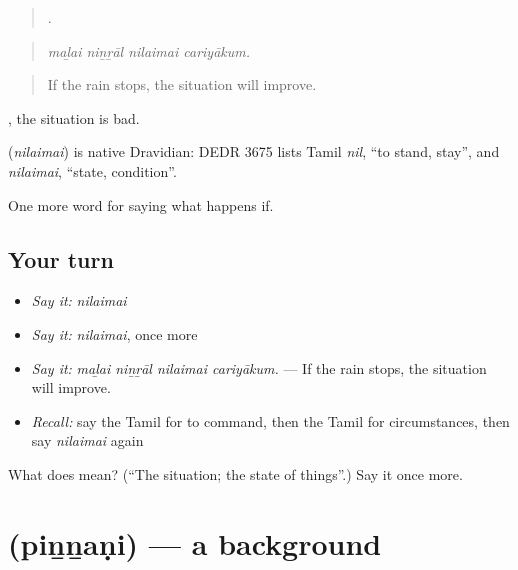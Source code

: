 \begin{quote}
   .
\end{quote}

\begin{quote}
\emph{maḻai niṉṟāl nilaimai cariyākum.}
\end{quote}

\begin{quote}
If the rain stops, the situation will improve.
\end{quote}

  , the situation is bad.

\begin{cousinweb}
\textbf{} (\emph{nilaimai}) is native Dravidian: DEDR 3675 lists Tamil \emph{nil}, \textquotedblleft{}to stand, stay\textquotedblright{}, and \emph{nilaimai}, \textquotedblleft{}state, condition\textquotedblright{}.
\end{cousinweb}

\begin{grammarlens}[title={What you've built}]
One more word for saying what happens if.
\end{grammarlens}

\subsection*{Your turn}
\begin{itemize}
\raggedright
  \item \emph{Say it:} \emph{nilaimai}
  \item \emph{Say it:} \emph{nilaimai}, once more
  \item \emph{Say it:} \emph{maḻai niṉṟāl nilaimai cariyākum.} — If the rain stops, the situation will improve.
  \item \emph{Recall:} say the Tamil for to command, then the Tamil for circumstances, then say \emph{nilaimai} again
\end{itemize}

\begin{tcolorbox}[breakable,colback=teal!4,colframe=teal!35!black,title={Before you move on}]
What does  mean? (\textquotedblleft{}The situation; the state of things\textquotedblright{}.) Say it once more.
\end{tcolorbox}
\section[\texorpdfstring{\ta{பின்னணி} (piṉṉaṇi)}{பின்னணி (piṉṉaṇi)}]{ (piṉṉaṇi) — a background}

